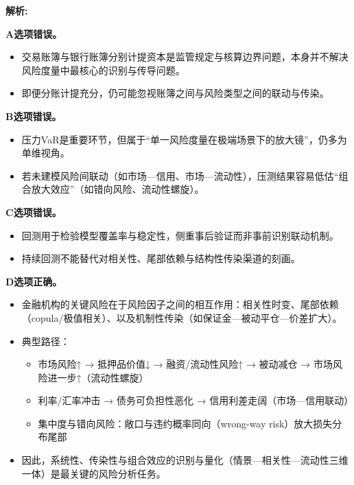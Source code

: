 \documentclass{article}
\newenvironment{explanation}
{\textbf{解析:}\par}
{\par}
\begin{document}
\begin{explanation}

    \textbf{A选项错误。}
    \begin{itemize}
        \item 交易账簿与银行账簿分别计提资本是监管规定与核算边界问题，本身并不解决风险度量中最核心的识别与传导问题。
        \item 即便分账计提充分，仍可能忽视账簿之间与风险类型之间的联动与传染。
    \end{itemize}

    \textbf{B选项错误。}
    \begin{itemize}
        \item 压力VaR是重要环节，但属于“单一风险度量在极端场景下的放大镜”，仍多为单维视角。
        \item 若未建模风险间联动（如市场—信用、市场—流动性），压测结果容易低估“组合放大效应”（如错向风险、流动性螺旋）。
    \end{itemize}

    \textbf{C选项错误。}
    \begin{itemize}
        \item 回测用于检验模型覆盖率与稳定性，侧重事后验证而非事前识别联动机制。
        \item 持续回测不能替代对相关性、尾部依赖与结构性传染渠道的刻画。
    \end{itemize}

    \textbf{D选项正确。}
    \begin{itemize}
        \item 金融机构的关键风险在于风险因子之间的相互作用：相关性时变、尾部依赖（copula/极值相关）、以及机制性传染（如保证金—被动平仓—价差扩大）。
        \item 典型路径：
        \begin{itemize}
            \item 市场风险↑ → 抵押品价值↓ → 融资/流动性风险↑ → 被动减仓 → 市场风险进一步↑（流动性螺旋）
            \item 利率/汇率冲击 → 债务可负担性恶化 → 信用利差走阔（市场—信用联动）
            \item 集中度与错向风险：敞口与违约概率同向（wrong-way risk）放大损失分布尾部
        \end{itemize}
        \item 因此，系统性、传染性与组合效应的识别与量化（情景—相关性—流动性三维一体）是最关键的风险分析任务。
    \end{itemize}

\end{explanation}
\end{document}
